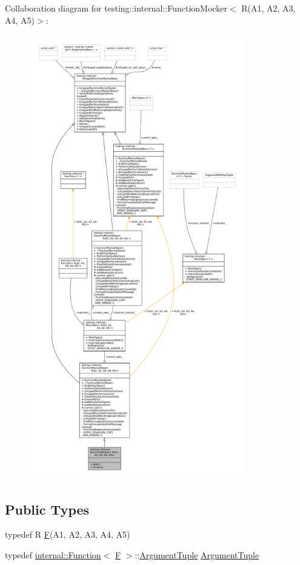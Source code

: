 Collaboration diagram for testing\+:\+:internal\+:\+:Function\+Mocker$<$ R(A1, A2, A3, A4, A5)$>$\+:
\nopagebreak
\begin{figure}[H]
\begin{center}
\leavevmode
\includegraphics[height=550pt]{classtesting_1_1internal_1_1FunctionMocker_3_01R_07A1_00_01A2_00_01A3_00_01A4_00_01A5_08_4__coll__graph}
\end{center}
\end{figure}
\subsection*{Public Types}
\begin{DoxyCompactItemize}
\item 
typedef R \hyperlink{classtesting_1_1internal_1_1FunctionMocker_3_01R_07A1_00_01A2_00_01A3_00_01A4_00_01A5_08_4_a26144c33c64b0af26a1d0c43806a0370}{F}(A1, A2, A3, A4, A5)
\item 
typedef \hyperlink{structtesting_1_1internal_1_1Function}{internal\+::\+Function}$<$ \hyperlink{classtesting_1_1internal_1_1FunctionMocker_3_01R_07A1_00_01A2_00_01A3_00_01A4_00_01A5_08_4_a26144c33c64b0af26a1d0c43806a0370}{F} $>$\+::\hyperlink{classtesting_1_1internal_1_1FunctionMocker_3_01R_07A1_00_01A2_00_01A3_00_01A4_00_01A5_08_4_ac82403b3f3e4e65797bb633ade91a43e}{Argument\+Tuple} \hyperlink{classtesting_1_1internal_1_1FunctionMocker_3_01R_07A1_00_01A2_00_01A3_00_01A4_00_01A5_08_4_ac82403b3f3e4e65797bb633ade91a43e}{Argument\+Tuple}
\end{DoxyCompactItemize}
